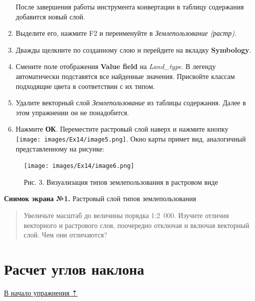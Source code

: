 \documentclass[12pt,]{book}
\begin{document}
\begin{enumerate}
  После завершения работы инструмента конвертации в таблицу содержания добавится новый слой.
\item
  Выделите его, нажмите F2 и переименуйте в \emph{Землепользование (растр)}.
\item
  Дважды щелкните по созданному слою и перейдите на вкладку \textbf{Symbology}.
\item
  Смените поле отображения \textbf{Value field} на \emph{Land\_type}. В легенду автоматически подставятся все найденные значения. Присвойте классам подходящие цвета в соответствии с их типом.
\item
  Удалите векторный слой \emph{Землепользование} из таблицы содержания. Далее в этом упражнении он не понадобится.
\item
  Нажмите \textbf{ОК}. Переместите растровый слой наверх и нажмите кнопку \texttt{[image: images/Ex14/image5.png]}. Окно карты примет вид, аналогичный представленному на рисунке:
\end{enumerate}

\begin{figure}
\centering
\texttt{[image: images/Ex14/image6.png]}
\caption{Рис. 3. Визуализация типов землепользования в растровом виде}
\end{figure}

\textbf{Снимок экрана №1.} Растровый слой типов землепользования

\begin{quote}
Увеличьте масштаб до величины порядка 1:2~000. Изучите отличия векторного и растрового слоя, поочередно отключая и включая векторный слой. Чем они отличаются?
\end{quote}

\hypertarget{weighted-overlay-slopes}{%
\section{Расчет углов наклона}\label{weighted-overlay-slopes}}

\protect\hyperlink{weighted-overlay}{В начало упражнения ⇡}
\end{document}
